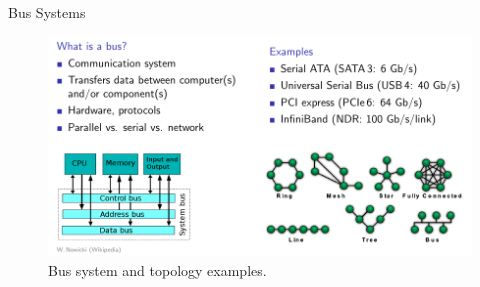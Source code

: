 \documentclass[10pt]{beamer}
\begin{document}
\begin{frame}{Bus Systems}
\begin{figure}
       \begin{center}
       \includegraphics[keepaspectratio, width=\textwidth,height=0.9\textheight-4\baselineskip]{img/201_bus.png}
      \end{center}
      \caption{Bus system and topology examples.~\autocite{mrupp}}
      \end{figure}
\end{frame}
\end{document}
